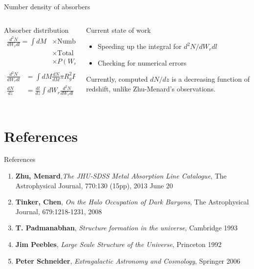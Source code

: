 \documentclass{beamer}
\begin{document}
		\begin{frame}{Number density of absorbers}
			\begin{columns}
				\begin{column}{0.6\textwidth}
					\begin{block}{Absorber distribution}
						\begin{equation}
						\begin{aligned}
						\frac{d^2N}{dW_rdl}=\int dM&\times\text{Number density of halos}\\
						&\times\text{Total cross section}\\
						&\times P(W_r|M)\\
						\end{aligned}
						\end{equation}
						$$
						\begin{aligned}
						\frac{d^2N}{dW_rdl}&=\int dM\frac{dN}{dM}\pi R_g^2P(W_r|M)\\
						\frac{dN}{dz}&=\frac{dl}{dz}\int dW_r\frac{d^2N}{dW_rdl}\\
						\end{aligned}
						$$
					\end{block}
				\end{column}
				\begin{column}{0.3\textwidth}
					\begin{block}{Current state of work}
						\begin{itemize}
							\item Speeding up the integral for $d^2N/dW_rdl$
							\item Checking for numerical errors
						\end{itemize}
						Currently, computed $dN/dz$ is a decreasing function of redshift, unlike Zhu-Menard's observations.
					\end{block}
				\end{column}
			\end{columns}
		\end{frame}
\section{References}
		\begin{frame}{References}
			\begin{enumerate}
				\item \textbf{Zhu, Menard},\textit{The JHU-SDSS Metal Absorption Line Catalogue}, The Astrophysical Journal, 770:130 (15pp), 2013 June 20
				\item \textbf{Tinker, Chen}, \textit{On the Halo Occupation of Dark Baryons}, The Astrophysical Journal, 679:1218-1231, 2008
				\item \textbf{T. Padmanabhan}, \textit{Structure formation in the universe}, Cambridge 1993
				\item \textbf{Jim Peebles}, \textit{Large Scale Structure of the Universe}, Princeton 1992
				\item \textbf{Peter Schneider}, \textit{Extragalactic Astronomy and Cosmology}, Springer 2006
			\end{enumerate}
		\end{frame}
\end{document}
